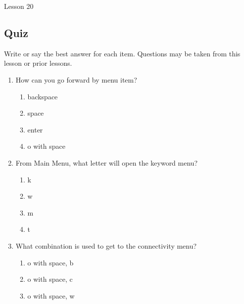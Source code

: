 \documentclass[10pt,letterpaper,twoside]{report}
\begin{document}
{{{{\clearpage

\newpage
Lesson 20

\subsection{Quiz}



Write or say the best answer for each item.  Questions may be taken from this lesson or prior lessons.



\begin{enumerate}
	\item How can you go forward by menu item?
	      
	      \begin{enumerate}
		      \item backspace
		            
		      \item space
		            
		      \item enter
		            
		      \item o with space
		            
		            
	      \end{enumerate}
	\item From Main Menu, what letter will open the keyword menu?
	      
	      \begin{enumerate}
		      \item k
		            
		      \item w
		            
		      \item m
		            
		      \item t
		            
		            
	      \end{enumerate}
	\item What combination is used to get to the connectivity menu?
	      
	      \begin{enumerate}
		      \item o with space, b
		            
		      \item o with space, c
		            
		      \item o with space, w
		            

\end{enumerate}
\end{enumerate}}}}}
\end{document}
